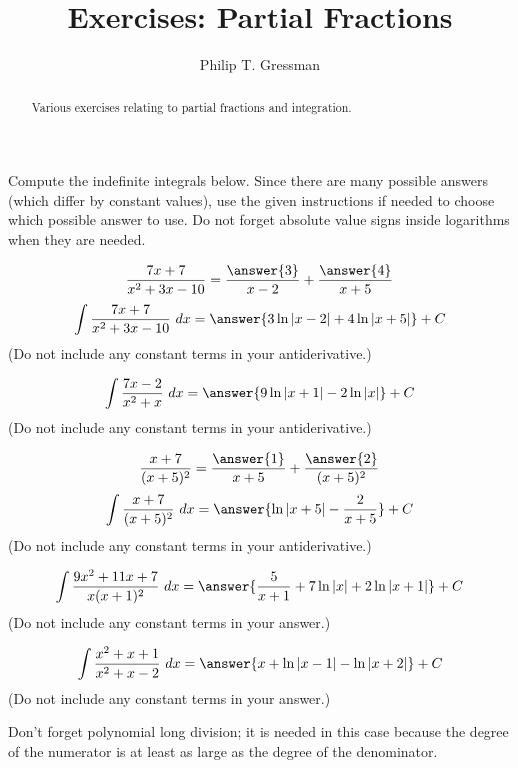 \documentclass{ximera}
\title{Exercises: Partial Fractions}
\author{Philip T. Gressman}
\begin{document}
\begin{abstract}
Various exercises relating to partial fractions and integration.
\end{abstract}
\maketitle


Compute the indefinite integrals below. Since there are many possible answers (which differ by constant values), use the given instructions if needed to choose which possible answer to use. Do not forget absolute value signs inside logarithms when they are needed.

\begin{exercise}%
\[ \frac{7x+7}{x^2+3x-10} = \frac{\answer{3}}{x-2} + \frac{\answer{4}}{x+5} \]
\[ \int \frac{7x+7}{x^2+3x-10}\ dx = \answer{3 \ln |x-2|+4 \ln |x+5|}+C\]
(Do not include any constant terms in your antiderivative.)
\end{exercise}

\begin{exercise}%
\[ \int \frac{7x-2}{x^2+x}\ dx = \answer{9 \ln |x+1|-2 \ln |x|}+C\]
(Do not include any constant terms in your antiderivative.)
%
%
\end{exercise}

\begin{exercise}%
\[ \frac{x+7}{(x+5)^2} = \frac{\answer{1}}{x+5} + \frac{\answer{2}}{(x+5)^2} \]
\[ \int \frac{x+7}{(x+5)^2}\ dx = \answer{\ln |x+5|-\frac{2}{x+5}}+C\]
(Do not include any constant terms in your antiderivative.)
%
%
\end{exercise}


\begin{exercise}%
\[ \int \frac{9x^2+11x+7}{x(x+1)^2}\ dx = \answer{\frac{5}{x+1}+7 \ln |x|+2 \ln |x+1|}+C\]
(Do not include any constant terms in your answer.)
%
%
\end{exercise}

\begin{exercise}%
\[ \int \frac{x^2+x+1}{x^2+x-2}\ dx = \answer{x+\ln |x-1|-\ln |x+2|}+C \]
(Do not include any constant terms in your answer.)
\begin{hint}
Don't forget polynomial long division; it is needed in this case because the degree of the numerator is at least as large as the degree of the denominator.
\end{hint}
%
%
\end{exercise}
\end{document}
